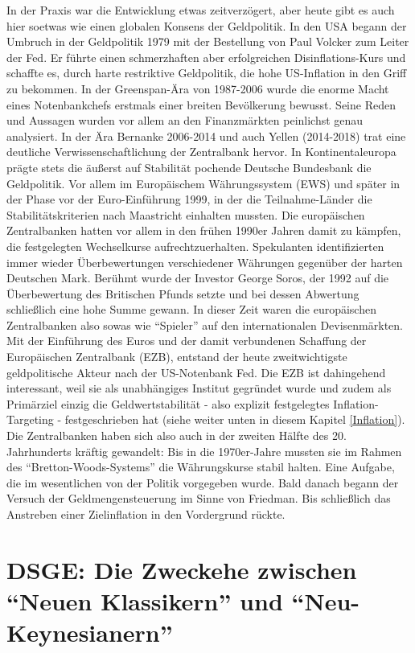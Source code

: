 In der Praxis war die Entwicklung etwas zeitverzögert, aber heute gibt es auch hier soetwas wie einen globalen Konsens der Geldpolitik. In den USA begann der Umbruch in der Geldpolitik 1979 mit der Bestellung von Paul Volcker zum Leiter der Fed. Er führte einen schmerzhaften aber erfolgreichen Disinflations-Kurs und schaffte es, durch harte restriktive Geldpolitik, die hohe US-Inflation in den Griff zu bekommen. In der Greenspan-Ära von 1987-2006 wurde die enorme Macht eines Notenbankchefs erstmals einer breiten Bevölkerung bewusst. Seine Reden und Aussagen wurden vor allem an den Finanzmärkten peinlichst genau analysiert. In der Ära Bernanke 2006-2014 und auch Yellen (2014-2018) trat eine deutliche Verwissenschaftlichung der Zentralbank hervor. In Kontinentaleuropa prägte stets die äußerst auf Stabilität pochende Deutsche Bundesbank die Geldpolitik. Vor allem im Europäischem Währungssystem (EWS) und später in der Phase vor der Euro-Einführung 1999, in der die Teilnahme-Länder die Stabilitätskriterien nach Maastricht einhalten mussten. Die europäischen Zentralbanken hatten vor allem in den frühen 1990er Jahren damit zu kämpfen, die festgelegten Wechselkurse aufrechtzuerhalten. Spekulanten identifizierten immer wieder Überbewertungen verschiedener Währungen gegenüber der harten Deutschen Mark. Berühmt wurde der Investor George Soros, der 1992 auf die Überbewertung des Britischen Pfunds setzte und bei dessen Abwertung schließlich eine hohe Summe gewann. In dieser Zeit waren die europäischen Zentralbanken also sowas wie "`Spieler"' auf den internationalen Devisenmärkten. Mit der Einführung des Euros und der damit verbundenen Schaffung der Europäischen Zentralbank (EZB), entstand der heute zweitwichtigste geldpolitische Akteur nach der US-Notenbank Fed. Die EZB ist dahingehend interessant, weil sie als unabhängiges Institut gegründet wurde und zudem als Primärziel einzig die Geldwertstabilität - also explizit festgelegtes Inflation-Targeting - festgeschrieben hat (siehe weiter unten in diesem Kapitel \ref{Inflation}). Die Zentralbanken haben sich also auch in der zweiten Hälfte des 20. Jahrhunderts kräftig gewandelt: Bis in die 1970er-Jahre mussten sie im Rahmen des "`Bretton-Woods-Systems"' die Währungskurse stabil halten. Eine Aufgabe, die im wesentlichen von der Politik vorgegeben wurde. Bald danach begann der Versuch der Geldmengensteuerung im Sinne von Friedman. Bis schließlich das Anstreben einer Zielinflation in den Vordergrund rückte.



\section{DSGE: Die Zweckehe zwischen "`Neuen Klassikern"' und "`Neu-Keynesianern"'}

